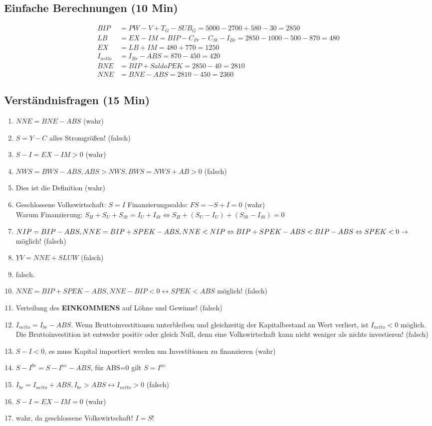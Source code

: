 \documentclass{scrartcl}
\begin{document}
\subsection{Einfache Berechnungen (10 Min)}
\begin{align*}
  BIP &= PW - V + T_G - SUB_G = 5000 - 2700 + 580 - 30 = 2850\\
  LB &= EX - IM = BIP - C_{Pr} - C_{St} - I_{Br} = 2850 - 1000 - 500 - 870 = 480\\
  EX &= LB + IM = 480 + 770 = 1250\\
  I_{netto} &= I_{Br} - ABS = 870-450=420\\
  BNE &= BIP + Saldo PEK = 2850 - 40 = 2810\\
  NNE &= BNE - ABS = 2810 - 450 = 2360
\end{align*}
\subsection{Verst\"{a}ndnisfragen (15 Min)}
\begin{enumerate}
  \item $NNE=BNE - ABS$ (wahr)
  \item $S=Y-C$ alles Stromgr\"{o}{\ss}en! (falsch)
  \item $S-I = EX-IM >0$ (wahr)
  \item $NWS = BWS -ABS, ABS>NWS, BWS = NWS + AB >0$ (falsch)
  \item Dies ist die Definition (wahr)
  \item Geschlossene Volkswirtschaft: $S=I$ Finanzierungssaldo: $FS=-S+I = 0$ (wahr)\\
  Warum Finanzierung: $S_H + S_U + S_{St} = I_{U}+I_{St} \Leftrightarrow S_H + (S_U-I_U)+(S_{St}-I_{St})=0$
  \item $NIP = BIP-ABS, NNE = BIP + SPEK -ABS,\\ NNE < NIP \Leftrightarrow BIP +SPEK - ABS < BIP -ABS \Leftrightarrow SPEK < 0 \rightarrow $ m\"{o}glich! (falsch)
  \item $YV = NNE + SLUW$ (falsch)
  \item falsch.
  \item $NNE=BIP+SPEK-ABS, NNE-BIP<0 \leftrightarrow SPEK < ABS$ m\"{o}glich! (falsch)
  \item Verteilung des \textbf{EINKOMMENS} auf L\"{o}hne und Gewinne! (falsch)
  \item $I_{netto} = I_{br} - ABS$. Wenn Bruttoinvestitionen unterbleiben und gleichzeitig der Kapitalbestand an Wert verliert, ist $I_{netto}<0$ m\"{o}glich. Die Bruttoinvestition ist entweder positiv oder gleich Null, denn eine Volkswirtschaft kann nicht weniger als nichts investieren! (falsch)
  \item $S-I<0$, es muss Kapital importiert werden um Investitionen zu finanzieren (wahr)
  \item $S-I^{br} = S - I^{ne} -ABS$, f\"{u}r ABS=0 gilt $S=I^{ne}$
  \item $I_{br} = I_{netto} + ABS, I_{br} > ABS \leftrightarrow I_{netto} > 0$ (falsch)
  \item $S-I = EX-IM = 0$ (wahr)
  \item wahr, da geschlossene Volkswirtschaft! $I=S$!
\end{enumerate}
\end{document}

